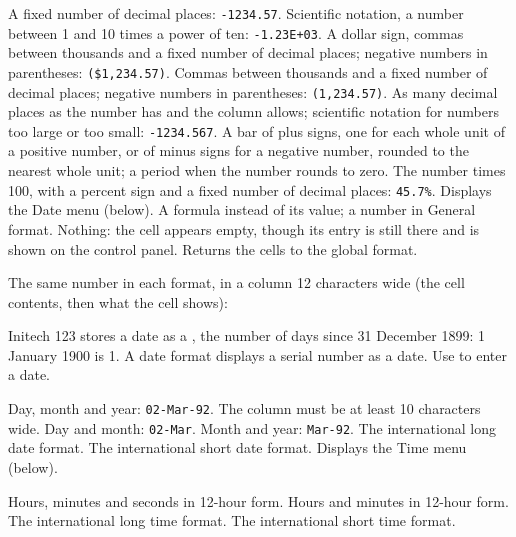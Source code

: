 \begin{Options}
 A fixed number of decimal places: \texttt{-1234.57}.
 Scientific notation, a number between 1 and 10 times a power
  of ten: \texttt{-1.23E+03}.
 A dollar sign, commas between thousands and a fixed
  number of decimal places; negative numbers in parentheses:
  \texttt{(\$1,234.57)}.
\Option{,} Commas between thousands and a fixed number of decimal places;
  negative numbers in parentheses: \texttt{(1,234.57)}.
 As many decimal places as the number has and the column
  allows; scientific notation for numbers too large or too small:
  \texttt{-1234.567}.
\Option{+/-} A bar of plus signs, one for each whole unit of a positive
  number, or of minus signs for a negative number, rounded to the nearest
  whole unit; a period when the number rounds to zero.
 The number times 100, with a percent sign and a fixed
  number of decimal places: \texttt{45.7\%}.
 Displays the Date menu (below).
 A formula instead of its value; a number in General format.
 Nothing: the cell appears empty, though its entry is still
  there and is shown on the control panel.
 Returns the cells to the global format.
\end{Options}

The same number in each format, in a column 12 characters wide (the cell
contents, then what the cell shows):

Initech 123 stores a date as a , the number of days
since 31 December 1899: 1 January 1900 is 1.  A date format displays a
serial number as a date.  Use  to enter a date.
\begin{Options}
 Day, month and year: \texttt{02-Mar-92}.  The column
  must be at least 10 characters wide.
 Day and month: \texttt{02-Mar}.
 Month and year: \texttt{Mar-92}.
 The international long date
  format.
 The international short
  date format.
 Displays the Time menu (below).
\end{Options}

\begin{Options}
 Hours, minutes and seconds
  in 12-hour form.
 Hours and minutes in 12-hour
  form.
 The international long time
  format.
 The international short time
  format.
\end{Options}

